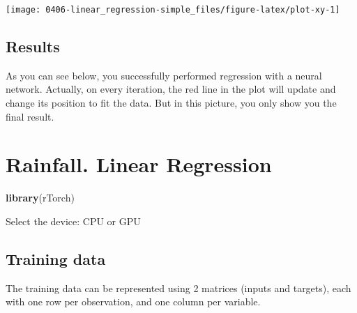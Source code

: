 \documentclass[]{book}
\newenvironment{Shaded}{\begin{snugshade}}{\end{snugshade}}
\newcommand{\CommentTok}[1]{\textcolor[rgb]{0.56,0.35,0.01}{\textit{#1}}}
\newcommand{\DecValTok}[1]{\textcolor[rgb]{0.00,0.00,0.81}{#1}}
\newcommand{\KeywordTok}[1]{\textcolor[rgb]{0.13,0.29,0.53}{\textbf{#1}}}
\newcommand{\NormalTok}[1]{#1}
\newcommand{\OperatorTok}[1]{\textcolor[rgb]{0.81,0.36,0.00}{\textbf{#1}}}
\newcommand{\StringTok}[1]{\textcolor[rgb]{0.31,0.60,0.02}{#1}}
\begin{document}
\begin{center}\texttt{[image: 0406-linear\_regression-simple\_files/figure-latex/plot-xy-1]} \end{center}

\hypertarget{results}{%
\section{Results}\label{results}}

As you can see below, you successfully performed regression with a neural network. Actually, on every iteration, the red line in the plot will update and change its position to fit the data. But in this picture, you only show you the final result.

\hypertarget{rainfall.-linear-regression}{%
\chapter{Rainfall. Linear Regression}\label{rainfall.-linear-regression}}

\begin{Shaded}
\begin{Highlighting}[]
\KeywordTok{library}\NormalTok{(rTorch)}
\end{Highlighting}
\end{Shaded}

Select the device: CPU or GPU

\begin{Shaded}
\end{Shaded}

\hypertarget{training-data}{%
\section{Training data}\label{training-data}}

The training data can be represented using 2 matrices (inputs and targets), each with one row per observation, and one column per variable.
\end{document}
